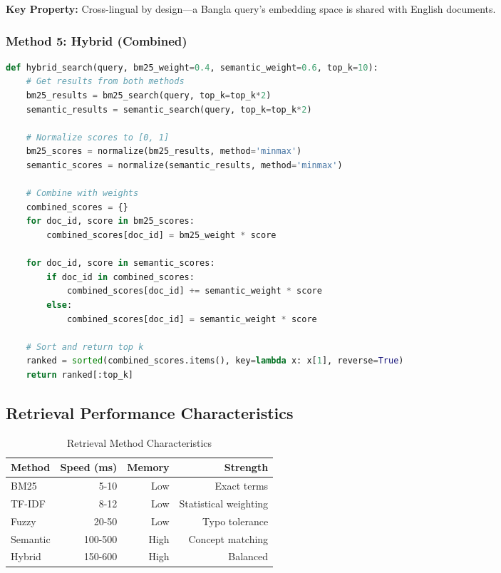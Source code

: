 \documentclass[12pt,a4paper]{report}
\begin{document}
\textbf{Key Property:} Cross-lingual by design---a Bangla query's embedding space is shared with English documents.

\subsubsection{Method 5: Hybrid (Combined)}

\begin{lstlisting}[language=Python, caption=Hybrid Retrieval]
def hybrid_search(query, bm25_weight=0.4, semantic_weight=0.6, top_k=10):
    # Get results from both methods
    bm25_results = bm25_search(query, top_k=top_k*2)
    semantic_results = semantic_search(query, top_k=top_k*2)
    
    # Normalize scores to [0, 1]
    bm25_scores = normalize(bm25_results, method='minmax')
    semantic_scores = normalize(semantic_results, method='minmax')
    
    # Combine with weights
    combined_scores = {}
    for doc_id, score in bm25_scores:
        combined_scores[doc_id] = bm25_weight * score
    
    for doc_id, score in semantic_scores:
        if doc_id in combined_scores:
            combined_scores[doc_id] += semantic_weight * score
        else:
            combined_scores[doc_id] = semantic_weight * score
    
    # Sort and return top k
    ranked = sorted(combined_scores.items(), key=lambda x: x[1], reverse=True)
    return ranked[:top_k]
\end{lstlisting}

\subsection{Retrieval Performance Characteristics}

\begin{table}[H]
    \centering
    \begin{tabular}{|l|r|r|r|}
        \hline
        \textbf{Method} & \textbf{Speed (ms)} & \textbf{Memory} & \textbf{Strength} \\
        \hline
        BM25 & 5-10 & Low & Exact terms \\
        TF-IDF & 8-12 & Low & Statistical weighting \\
        Fuzzy & 20-50 & Low & Typo tolerance \\
        Semantic & 100-500 & High & Concept matching \\
        Hybrid & 150-600 & High & Balanced \\
        \hline
    \end{tabular}
    \caption{Retrieval Method Characteristics}
\end{table}
\end{document}
